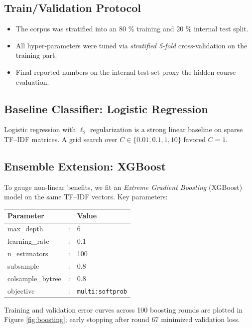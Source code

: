 \documentclass[12pt]{article}
\begin{document}
\subsection{Train/Validation Protocol}
\begin{itemize}
  \item The corpus was stratified into an 80 \% training and 20 \% internal test split.
  \item All hyper-parameters were tuned via \emph{stratified 5-fold} cross-validation on the training part.
  \item Final reported numbers on the internal test set proxy the hidden course evaluation.
\end{itemize}

\subsection{Baseline Classifier: Logistic Regression}
Logistic regression with $\ell_2$ regularization is a strong linear baseline on sparse TF–IDF matrices.
A grid search over $C\in\{0.01,0.1,1,10\}$ favored $C=1$.

\subsection{Ensemble Extension: XGBoost}
To gauge non-linear benefits, we fit an \textit{Extreme Gradient Boosting} (XGBoost) model on the same
TF–IDF vectors.  Key parameters:
\begin{center}
\begin{tabular}{@{}lcl@{}}
\toprule
\textbf{Parameter} & & \textbf{Value}\\
\midrule
max\_depth         &:& 6\\
learning\_rate     &:& 0.1\\
n\_estimators      &:& 100\\
subsample          &:& 0.8\\
colsample\_bytree  &:& 0.8\\
objective          &:& \texttt{multi:softprob}\\
\bottomrule
\end{tabular}
\end{center}

Training and validation error curves across 100 boosting rounds are plotted in
Figure \ref{fig:boosting}; early stopping after round 67 minimized validation loss.
\end{document}
